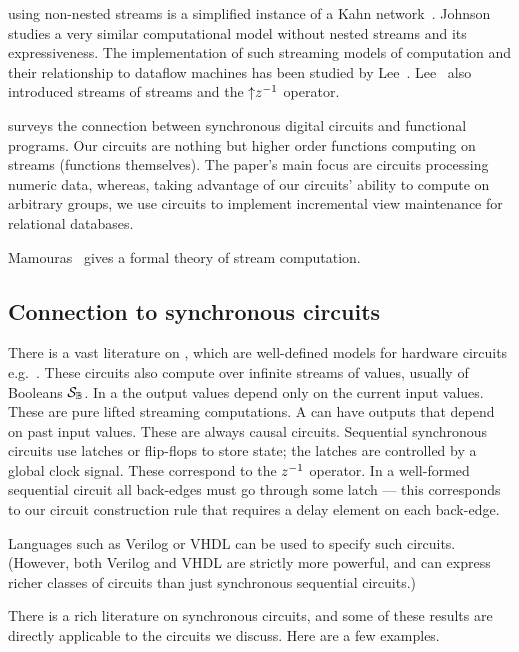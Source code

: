 \dbsp using non-nested streams is a simplified instance of a Kahn
network~\cite{kahn-ifip74}.  Johnson~\cite{johnson-phd83} studies a
very similar computational model without nested streams and its
expressiveness. The implementation of such streaming models of
computation and their relationship to dataflow machines has been
studied by Lee~\cite{lee-ieee95}.  Lee~\cite{lee-ifip93} also
introduced streams of streams and the ${\uparrow}z^{-1}$ operator.

\cite{gammie-acs13} surveys the connection between synchronous digital
circuits and functional programs.  Our circuits are nothing but higher
order functions computing on streams (functions themselves).  The
paper's main focus are circuits processing numeric data, whereas,
taking advantage of our circuits' ability to compute on arbitrary
groups, we use circuits to implement incremental view maintenance for
relational databases.

Mamouras~\cite{mamouras-esop20} gives a formal theory of stream computation.

\subsection{Connection to synchronous circuits}

There is a vast literature on , which
are well-defined models for hardware circuits
e.g.~\cite{gammie-acs13}.  These circuits also compute over infinite
streams of values, usually of Booleans $\mathcal{S}_{\mathbb{B}}$.  In a
 the output values depend only on the
current input values.  These are pure lifted streaming computations.
A  can have outputs that depend on past
input values.  These are always causal circuits.  Sequential
synchronous circuits use latches or flip-flops to store state; the
latches are controlled by a global clock signal.  These correspond to
the $z^{-1}$ operator.  In a well-formed sequential circuit all
back-edges must go through some latch --- this corresponds to our
circuit construction rule that requires a delay element on each
back-edge.

Languages such as Verilog or VHDL can be used to specify such
circuits.  (However, both Verilog and VHDL are strictly more powerful,
and can express richer classes of circuits than just synchronous
sequential circuits.)

There is a rich literature on synchronous circuits, and some of these
results are directly applicable to the circuits we discuss.  Here are
a few examples.

